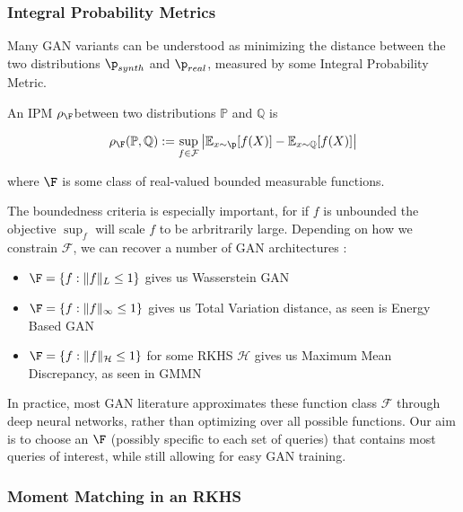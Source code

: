 
\subsubsection{Integral Probability Metrics}

Many GAN variants can be understood as minimizing the distance between the two distributions $\p_{synth}$ and $\p_{real}$, measured by some Integral Probability Metric.

\begin{definition}
    An IPM $\rho_\F$between two distributions $\mathbb{P}$ and $\mathbb{Q}$ is 

    \begin{equation}
        \rho_\F(\mathbb{P}, \mathbb{Q})  := \sup_{f \in \mathcal{F}} \big| \mathbb{E}_{x \sim \p}[f(X)] - \mathbb{E}_{x \sim \mathbb{Q}}[f(X)] \big|
    \end{equation}

    where $\F$ is some class of real-valued bounded measurable functions.
\end{definition}

The boundedness criteria is especially important, for if $f$ is unbounded the objective $\sup_f$ will scale $f$ to be arbritrarily large. Depending on how we constrain $\mathcal{F}$, we can recover a number of GAN architectures \cite{zotero-1283}: 

\begin{itemize}
    \item $\F = \{f: \|f\|_L \leq 1\}$ gives us Wasserstein GAN \cite{ACB17}
    \item $\F = \{f: \|f\|_\infty \leq 1 \}$ gives us Total Variation distance, as seen is Energy Based GAN \cite{ZML17}
    \item $\F = \{f: \|f\|_\mathcal{H} \leq 1 \}$ for some RKHS $\mathcal{H}$  gives us Maximum Mean Discrepancy, as seen in GMMN \cite{LSZ15a}
\end{itemize}

In practice, most GAN literature approximates these function class $\mathcal{F}$ through deep neural networks, rather than optimizing over all possible functions. Our aim is to choose an $\F$ (possibly specific to each set of queries) that contains most queries of interest, while still allowing for easy GAN training. 

\subsubsection{Moment Matching in an RKHS}

